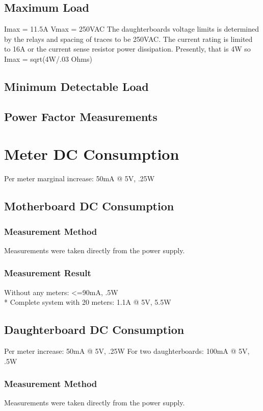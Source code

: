 \documentclass[]{article}
\begin{document}
\subsection{Maximum Load}
Imax = 11.5A
Vmax = 250VAC
The daughterboards voltage limits is determined by the relays and spacing of traces to be 250VAC.
The current rating is limited to 16A or the current sense resistor power dissipation. Presently, that is 4W so Imax = sqrt(4W/.03 Ohms)

\subsection{Minimum Detectable Load}

\subsection{Power Factor Measurements}

\section{Meter DC Consumption}
    Per meter marginal increase: 50mA @ 5V, .25W

\subsection{Motherboard DC Consumption}

\subsubsection{Measurement Method}
    Measurements were taken directly from the power supply.
\subsubsection{Measurement Result}
    Without any meters: <=90mA, .5W \\*
    Complete system with 20 meters: 1.1A @ 5V, 5.5W

\subsection{Daughterboard DC Consumption}
    Per meter increase: 50mA @ 5V, .25W
    For two daughterboards: 100mA @ 5V, .5W

\subsubsection{Measurement Method}
    Measurements were taken directly from the power supply.
\end{document}

